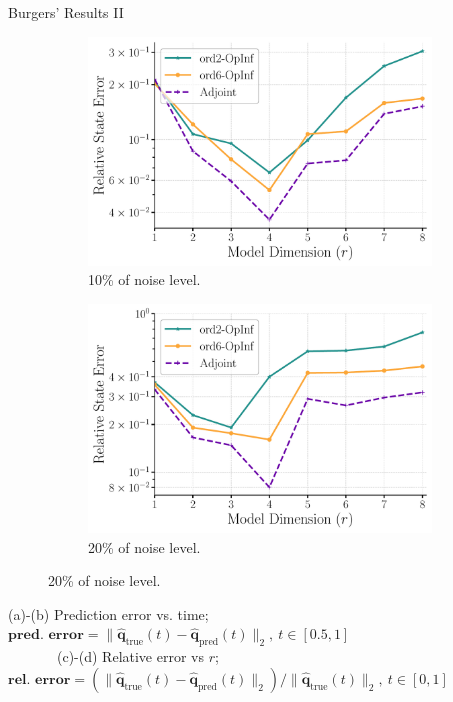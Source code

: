 \begin{frame}{Burgers' Results II}
\begin{figure}[h!]
  
  \begin{subfigure}[b]{0.3\textwidth}
    \centering
    \includegraphics[width=\linewidth]{images/rel_error_vs_r_noise_10.pdf}
    \caption{10\% of noise level.}
    \label{fig:image3}
  \end{subfigure}
  \hspace{1.0cm}
  \begin{subfigure}[b]{0.3\textwidth}
    \centering
    \includegraphics[width=\linewidth]{images/rel_error_vs_r_noise_20.pdf}
    \caption{20\% of noise level.}
    \label{fig:image4}
  \end{subfigure}
  
  \label{fig:twobytwo1}
\end{figure}
\begin{center}
    \tiny
    (a)-(b) Prediction error vs. time; $\textbf{pred. error}=\| \hat{\mathbf{q}}_{\text{true}}(t) - \hat{\mathbf{q}}_{\text{pred}}(t) \|_2, ~t\in[0.5,1]$\\~~~~~~~(c)-(d) Relative error vs $r$; $\textbf{rel. error}=\left(\| \hat{\mathbf{q}}_{\text{true}}(t) - \hat{\mathbf{q}}_{\text{pred}}(t) \|_2\right)/\| \hat{\mathbf{q}}_{\text{true}}(t) \|_2, ~t\in[0,1]$
\end{center}

\end{frame}

